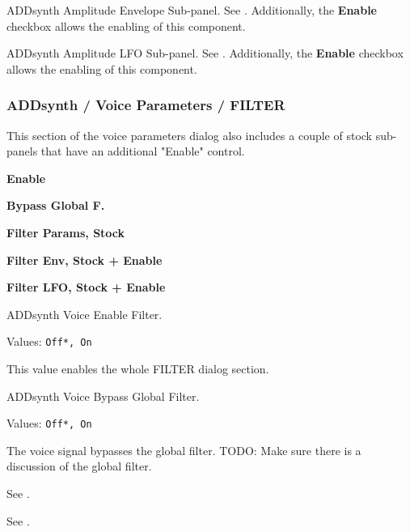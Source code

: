    ADDsynth Amplitude Envelope Sub-panel.
   See .
   Additionally, the \textbf{Enable} checkbox allows the enabling of this
   component.

   ADDsynth Amplitude LFO Sub-panel.
   See .
   Additionally, the \textbf{Enable} checkbox allows the enabling of this
   component.

\subsubsection{ADDsynth / Voice Parameters / FILTER}
\label{subsubsec:addsynth_voice_parameters_filter}

   This section of the voice parameters dialog also includes a couple of
   stock sub-panels that have an additional "Enable" control.

   \begin{enumber}
      \item \textbf{Enable}
      \item \textbf{Bypass Global F.}
      \item \textbf{Filter Params, Stock}
      \item \textbf{Filter Env, Stock + Enable}
      \item \textbf{Filter LFO, Stock + Enable}
   \end{enumber}

   \setcounter{ItemCounter}{0}      %

   ADDsynth Voice Enable Filter.

   Values: \texttt{Off*, On}

   This value enables the whole FILTER dialog section.

   ADDsynth Voice Bypass Global Filter.

   Values: \texttt{Off*, On}

   The voice signal bypasses the global filter.
   TODO:  Make sure there is a discussion of the global filter.

   See .

   See .


